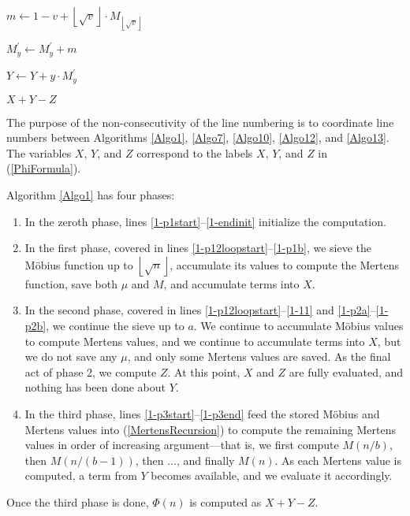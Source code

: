 \documentclass[12pt]{article}
\newcommand{\floor}[1]{{\left\lfloor #1 \right\rfloor}}
\newcommand{\isqrt}[1]{\floor{\sqrt{#1}}}
\begin{document}
\begin{algorithm}[H]
\begin{multicols}{2}
{    $m \gets 1 - v + \isqrt{v} \cdot M_{\isqrt{v}}$ \label{1-23}
    
    \For{$x=2$ \KwTo $\isqrt{v}$}{
        $m \gets m - \mu_x \cdot \floor{v/x}$ \label{1-p3mobius}
        
        \uIf{$\floor{v/x} \leq \isqrt{n}$}{
            $m \gets m - M_{\floor{v/x}}$
        }
        \Else{
            $m \gets m - M^\prime_{\floor{n/\floor{v/x}}}$
        }
    }
    $M^\prime_y \gets M^\prime_y + m$
    
    $Y \gets Y + y \cdot M^\prime_y$ \label{1-p3end}
}
\end{multicols}

\KwRet $X + Y - Z$
\end{algorithm}

The purpose of the non-consecutivity of the line numbering is to coordinate line numbers between Algorithms \ref{Algo1}, \ref{Algo7}, \ref{Algo10}, \ref{Algo12}, and \ref{Algo13}.  The variables $X$, $Y$, and $Z$ correspond to the labels $X$, $Y$, and $Z$ in (\ref{PhiFormula}).

Algorithm \ref{Algo1} has four phases:
\begin{enumerate} \addtocounter{enumi}{-1}
\item In the zeroth phase, lines \ref{1-p1start}--\ref{1-endinit} initialize the computation.
\item In the first phase, covered in lines \ref{1-p12loopstart}--\ref{1-p1b}, we sieve the M\"{o}bius function up to $\isqrt{n}$, accumulate its values to compute the Mertens function, save both $\mu$ and $M$, and accumulate terms into $X$.
\item In the second phase, covered in lines \ref{1-p12loopstart}--\ref{1-11} and \ref{1-p2a}--\ref{1-p2b}, we continue the sieve up to $a$.  We continue to accumulate M\"{o}bius values to compute Mertens values, and we continue to accumulate terms into $X$, but we do not save any $\mu$, and only some Mertens values are saved.  As the final act of phase 2, we compute $Z$.  At this point, $X$ and $Z$ are fully evaluated, and nothing has been done about $Y$.
\item In the third phase, lines \ref{1-p3start}--\ref{1-p3end} feed the stored M\"{o}bius and Mertens values into (\ref{MertensRecursion}) to compute the remaining Mertens values in order of increasing argument---that is, we first compute $M(n/b)$, then $M(n/(b-1))$, then ..., and finally $M(n)$.  As each Mertens value is computed, a term from $Y$ becomes available, and we evaluate it accordingly.
\end{enumerate}
Once the third phase is done, $\Phi(n)$ is computed as $X+Y-Z$.
\end{document}
